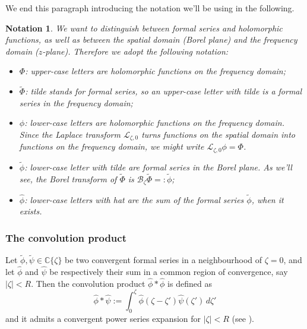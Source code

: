 \documentclass{article}
\newcommand{\C}{\mathbb{C}}
\newcommand{\series}[1]{\tilde{#1}}
\newcommand{\laplace}{\mathcal{L}}
\newcommand{\borel}{\mathcal{B}}
\theoremstyle{definition}
\theoremstyle{plain}
\newtheorem*{notation*}{Notation}
\begin{document}
We end this paragraph introducing the notation we'll be using in the following. 
\begin{notation*}
We want to distinguish between formal series and holomorphic functions, as well as between the spatial domain (Borel plane) and the frequency domain ($z$-plane). Therefore we adopt the following notation:
\begin{itemize}
\item $\Phi$: upper-case letters are holomorphic functions on the frequency domain;
\item $\tilde{\Phi}$: \textit{tilde} stands for formal series, so an upper-case letter with \textit{tilde} is a formal series in the frequency domain;
\item $\phi$: lower-case letters are holomorphic functions on the frequency domain. Since the Laplace transform $\laplace_{\zeta, 0}$ turns functions on the spatial domain into functions on the frequency domain, we might write $\laplace_{\zeta,0}\phi=\Phi$.
\item $\tilde{\phi}$: lower-case letter with \textit{tilde} are formal series in the Borel plane. As we’ll see, the Borel transform of $\tilde{\Phi}$ is $\borel_\zeta \tilde{\Phi}=:\tilde{\phi}$; 
\item $\hat{\phi}$: lower-case letters with \textit{hat} are the sum of the formal series $\tilde{\phi}$, when it exists.  
\end{itemize}
\end{notation*}  

\subsubsection{The convolution product}\label{convolution}
%
Let $\series{\phi},\series{\psi}\in\C\lbrace\zeta\rbrace$ be two convergent formal series in a neighbourhood of $\zeta=0$, and let $\hat{\phi}$ and $\hat{\psi}$ be respectively their sum in a common region of convergence, say $|\zeta|<R$. Then the convolution product $\hat{\phi}\ast\hat{\phi}$ is defined as
\begin{equation}\label{eq:convolution}
    \hat{\phi}\ast\hat{\psi}:=\int_0^{\zeta}\hat{\phi}(\zeta-\zeta')\hat{\psi}(\zeta')\, d\zeta'
\end{equation}
and it admits a convergent power series expansion for $|\zeta|<R$ (see \cite[Lemma 5.14]{diverg-resurg-i}).
\end{document}
